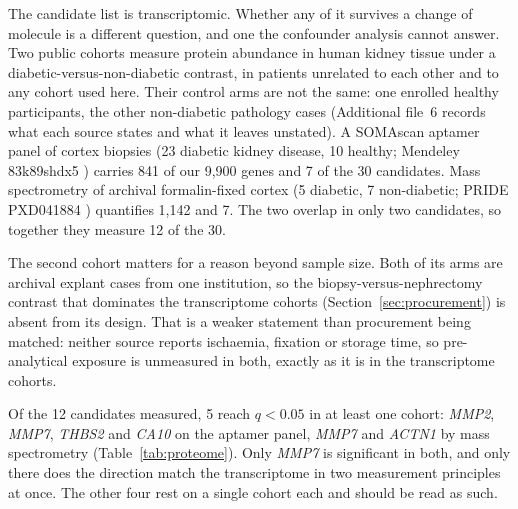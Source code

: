 \documentclass[pdflatex,sn-vancouver-num]{sn-jnl}
\theoremstyle{thmstyleone}
\theoremstyle{thmstyletwo}
\theoremstyle{thmstylethree}
\begin{document}
The candidate list is transcriptomic. Whether any of it survives a change of molecule is a
different question, and one the confounder analysis cannot answer. Two public cohorts measure
protein abundance in human kidney tissue under a diabetic-versus-non-diabetic contrast, in
patients unrelated to each other and to any cohort used here. Their control arms are not the
same: one enrolled healthy participants, the other non-diabetic pathology cases (Additional
file~6 records what each source states and what it leaves unstated). A SOMAscan aptamer panel of cortex
biopsies (23 diabetic kidney disease, 10 healthy; Mendeley 83k89shdx5 \cite{hirohama2023}) carries
841 of our
9,900 genes and 7 of the 30 candidates. Mass spectrometry of archival formalin-fixed cortex
(5 diabetic, 7 non-diabetic; PRIDE PXD041884 \cite{schwab2024}) quantifies 1,142 and 7. The two overlap in only
two candidates, so together they measure 12 of the 30.

The second cohort matters for a reason beyond sample size. Both of its arms are archival explant
cases from one institution, so the biopsy-versus-nephrectomy contrast that dominates the
transcriptome cohorts (Section~\ref{sec:procurement}) is absent from its design. That is a
weaker statement than procurement being matched: neither source reports ischaemia, fixation or
storage time, so pre-analytical exposure is unmeasured in both, exactly as it is in the
transcriptome cohorts.

Of the 12 candidates measured, 5 reach $q < 0.05$ in at least one cohort: \textit{MMP2},
\textit{MMP7}, \textit{THBS2} and \textit{CA10} on the aptamer panel, \textit{MMP7} and \textit{ACTN1} by
mass spectrometry (Table~\ref{tab:proteome}). Only \textit{MMP7} is significant in both, and only
there does the direction match the transcriptome in two measurement principles at once. The
other four rest on a single cohort each and should be read as such.
\end{document}
